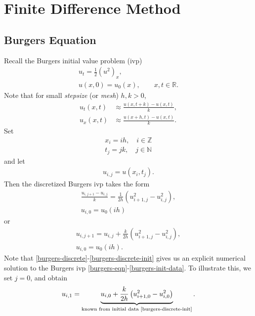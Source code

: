 \documentclass[12pt,reqno]{amsart}
\numberwithin{equation}{section}  %
\numberwithin{figure}{section}
\newcommand{\rr}{\mathbb{R}}
\theoremstyle{plain}
\theoremstyle{definition}
\theoremstyle{remark}
\begin{document}
\section{Finite Difference Method}
\subsection{Burgers Equation}
Recall the Burgers initial value problem (ivp)
%
%
\begin{gather}
	\label{burgers-eqn}
	u_{t} = \frac{1}{2}(u^{2})_{x},
	\\
	\label{burgers-init-data}
	u(x, 0) = u_{0}(x), \qquad x, t \in \rr.
\end{gather}
%
%
Note that for small \emph{stepsize} (or \emph{mesh}) $h, k >0$, 
%
%
\begin{equation*}
	\begin{split}
		 u_{t}(x,t) &\approx \frac{u(x, t+k) - u(x, t)}{k},
		\\
		 u_{x}(x, t) & \approx \frac{u(x+h, t) - u(x, t)}{k}.
	\end{split}
\end{equation*}
%
%
Set
\begin{gather*}
	x_i = ih, \quad i \in \mathbb{Z}
	\\
	t_{j}=jk, \quad j \in \mathbb{N}
\end{gather*}
and let
\begin{gather*}
	u_{i,j} = u(x_{i}, t_{j}).
\end{gather*}
%
%
Then the discretized Burgers ivp takes the form
%
%
\begin{gather*}
	\frac{u_{i, j+1}- u_{i,j}}{k}=\frac{1}{2h}\left( u_{i+1,j}^{2} -
	u_{i,j}^{2} \right),
	\\
	u_{i,0} = u_{0}(ih)
\end{gather*}
%
%
or
\begin{gather}
	\label{burgers-discrete}
	u_{i, j+1}=u_{i,j} + \frac{k}{2h}\left( u_{i+1,j}^{2} -
	u_{i,j}^{2} \right),
	\\
	\label{burgers-discrete-init}
	u_{i,0} = u_{0}(ih).
\end{gather}
Note that \eqref{burgers-discrete}-\eqref{burgers-discrete-init} gives us an
explicit numerical solution to the Burgers ivp
\eqref{burgers-eqn}-\eqref{burgers-init-data}. To illustrate this, we set
$j=0$, and obtain
%
%
\begin{equation}
	\label{case-j=0}
	\begin{split}
		u_{i,1} = \underbrace{u_{i,0} + \frac{k}{2h}\left( u_{i+1,0}^{2} -
		u_{i,0}^{2} \right)}_{\text{known from initial data
		\eqref{burgers-discrete-init}}}.
	\end{split}
\end{equation}
\end{document}
